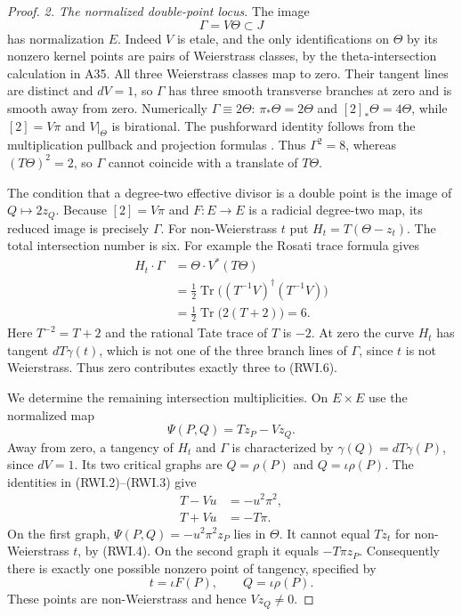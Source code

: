 \documentclass[11pt,a4paper]{article}
\begin{document}
\begin{proof}
\emph{2. The normalized double-point locus.}
The image
\[
                         \Gamma=V\Theta\subset J
 \tag{RWI.5}
\]
has normalization $E$. Indeed $V$ is etale, and the only
identifications on $\Theta$ by its nonzero kernel points
are pairs of Weierstrass classes, by the theta-intersection
calculation in A35. All three Weierstrass classes map to
zero. Their tangent lines are distinct and $dV=1$, so
$\Gamma$ has three smooth transverse branches at zero
and is smooth away from zero. Numerically $\Gamma\equiv2\Theta$:
$\pi_*\Theta=2\Theta$ and $[2]_*\Theta=4\Theta$, while
$[2]=V\pi$ and $V|_\Theta$ is birational. The pushforward
identity follows from the multiplication pullback and projection
formulas \cite[Corollary~6.6 and Lemma~8.3]{MilneAV}.
Thus $\Gamma^2=8$, whereas $(T\Theta)^2=2$, so $\Gamma$
cannot coincide with a translate of $T\Theta$.

The condition that a degree-two effective divisor is a
double point is the image of $Q\mapsto 2z_Q$.
Because $[2]=V\pi$ and $F:E\to E$ is a radicial degree-two
map, its reduced image is precisely $\Gamma$.
For non-Weierstrass $t$ put
$H_t=T(\Theta-z_t)$. The total intersection number is six.
For example the Rosati trace formula gives
\[
 \begin{aligned}
 H_t\cdot\Gamma
 &=\Theta\cdot V^*(T\Theta)\\
 &=\tfrac12\operatorname{Tr}
       \bigl((T^{-1}V)^\dagger(T^{-1}V)\bigr)\\
 &=\tfrac12\operatorname{Tr}\bigl(2(T+2)\bigr)=6.
 \end{aligned}
 \tag{RWI.6}
\]
Here $T^{-2}=T+2$ and the rational Tate trace of $T$ is
$-2$. At zero the curve $H_t$ has tangent
$dT\gamma(t)$, which is not one of the three branch
lines of $\Gamma$, since $t$ is not Weierstrass.
Thus zero contributes exactly three to (RWI.6).

We determine the remaining intersection multiplicities.
On $E\times E$ use the normalized map
\[
                    \Psi(P,Q)=Tz_P-Vz_Q.
 \tag{RWI.7}
\]
Away from zero, a tangency of $H_t$ and $\Gamma$ is
characterized by $\gamma(Q)=dT\gamma(P)$, since
$dV=1$. Its two critical graphs are
$Q=\rho(P)$ and $Q=\iota\rho(P)$.
The identities in (RWI.2)--(RWI.3) give
\[
 \begin{aligned}
 T-Vu&=-u^2\pi^2,\\
 T+Vu&=-T\pi.
 \end{aligned}
 \tag{RWI.8}
\]
On the first graph, $\Psi(P,Q)=-u^2\pi^2z_P$ lies in
$\Theta$. It cannot equal $Tz_t$ for non-Weierstrass $t$,
by (RWI.4). On the second graph it equals $-T\pi z_P$.
Consequently there is exactly one possible nonzero
point of tangency, specified by
\[
                   t=\iota F(P),\qquad Q=\iota\rho(P).
 \tag{RWI.9}
\]
These points are non-Weierstrass and hence $Vz_Q\ne0$.


\end{proof}
\end{document}
